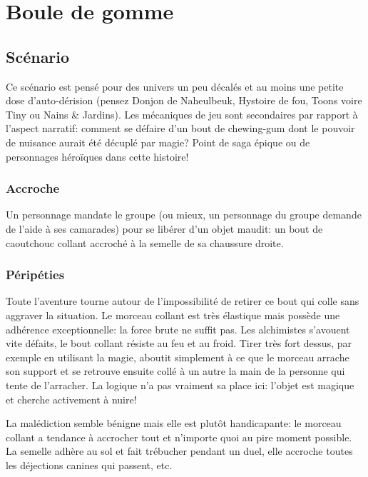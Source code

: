 \chapter{Boule de gomme}

\section{Scénario}

Ce scénario est pensé pour des univers un peu décalés et au moins une petite dose d'auto-dérision (pensez Donjon de Naheulbeuk, Hystoire de fou, Toons voire Tiny ou Nains \& Jardins).
Les mécaniques de jeu sont secondaires par rapport à l'aspect narratif: comment se défaire d'un bout de chewing-gum dont le pouvoir de nuisance aurait été décuplé par magie?
Point de saga épique ou de personnages héroïques dans cette histoire!

\subsection{Accroche}

Un personnage mandate le groupe (ou mieux, un personnage du groupe demande de l'aide à ses camarades) pour se libérer d'un objet maudit: un bout de caoutchouc collant accroché à la semelle de sa chaussure droite.

\subsection{Péripéties}

Toute l'aventure tourne autour de l'impossibilité de retirer ce bout qui colle sans aggraver la situation.
Le morceau collant est très élastique mais possède une adhérence exceptionnelle: la force brute ne suffit pas.
Les alchimistes s'avouent vite défaits, le bout collant résiste au feu et au froid.
Tirer très fort dessus, par exemple en utilisant la magie, aboutit simplement à ce que le morceau arrache son support et se retrouve ensuite collé à un autre la main de la personne qui tente de l'arracher.
La logique n'a pas vraiment sa place ici: l'objet est magique et cherche activement à nuire!

La malédiction semble bénigne mais elle est plutôt handicapante: le morceau collant a tendance à accrocher tout et n'importe quoi au pire moment possible.
La semelle adhère au sol et fait trébucher pendant un duel, elle accroche toutes les déjections canines qui passent, etc.

